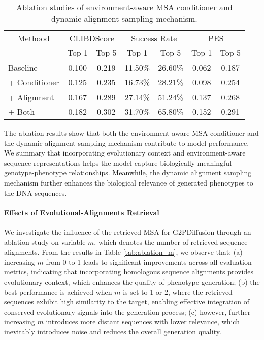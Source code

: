 \begin{table}[h]
\centering
\caption{Ablation studies of environment-aware MSA conditioner and dynamic alignment sampling mechanism.}
\label{tab:ablation}
\begin{adjustbox}{width=1\linewidth}
    \begin{tabular}{l|cc|cc|cc}
    \toprule
    \multicolumn{1}{c|}{Methood} & \multicolumn{2}{c|}{CLIBDScore} & \multicolumn{2}{c|}{Success Rate} & \multicolumn{2}{c}{PES} \\
    & Top-1 & Top-5 & Top-1 & Top-5 & Top-1 & Top-5 \\
    \midrule
    Baseline & 0.100 & 0.219 & 11.50\% & 26.60\% & 0.062 & 0.187 \\
    + Conditioner & 0.125 & 0.235 & 16.73\% & 28.21\% & 0.098 & 0.254 \\
    + Alignment & 0.167 & 0.289 & 27.14\% & 51.24\% & 0.137 & 0.268 \\
    + Both & 0.182 & 0.302 & 31.70\% & 65.80\% & 0.152 & 0.291 \\
    \bottomrule
    \end{tabular}
\end{adjustbox}
\vspace{-3mm}
\end{table}

The ablation results show that both the environment-aware MSA conditioner and the dynamic alignment sampling mechanism contribute to model performance. We summary that incorporating evolutionary context and environment-aware sequence representations helps the model capture biologically meaningful genotype-phenotype relationships. Meanwhile, the dynamic alignment sampling mechanism further enhances the biological relevance of generated phenotypes to the DNA sequences.





\paragraph{Effects of Evolutional-Alignments Retrieval}

We investigate the influence of the retrieved MSA for G2PDiffusion through an ablation study on variable $m$, which denotes the number of retrieved sequence alignments.
From the results in Table \ref{tab:ablation_m}, we observe that: 
(a) increasing $m$ from 0 to 1 leads to significant improvements across all evaluation metrics, indicating that incorporating homologous sequence alignments provides evolutionary context, which enhances the quality of phenotype generation; (b) the best performance is achieved when $m$ is set to 1 or 2, where the retrieved sequences exhibit high similarity to the target, enabling effective integration of conserved evolutionary signals into the generation process; (c) however, further increasing $m$ introduces more distant sequences with lower relevance, which inevitably introduces noise and reduces the overall generation quality. 


